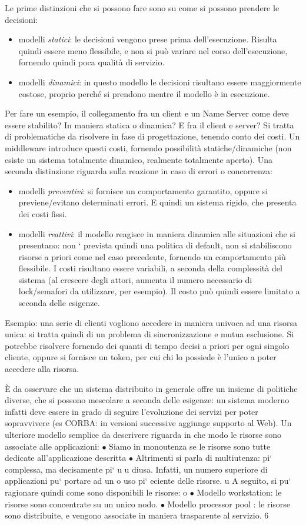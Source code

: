 \documentclass[a4paper,12pt]{article}
\begin{document}
Le prime distinzioni che si possono fare sono su come si possono prendere le decisioni:
\begin{itemize}
 \item modelli \textit{statici}: le decisioni vengono prese prima dell'esecuzione. Risulta quindi essere meno
flessibile, e non si può variare nel corso dell'esecuzione, fornendo quindi poca qualità di servizio.
\item modelli \textit{dinamici}: in questo modello le decisioni risultano essere maggiormente costose, proprio perché 
si prendono mentre il modello è in esecuzione.
\end{itemize}
Per fare un esempio, il collegamento fra un client e un Name Server come deve essere stabilito? In maniera statica o
dinamica? E fra il client e server? Si tratta di problematiche da risolvere in fase di progettazione, tenendo conto 
dei costi. Un middleware introduce questi costi, fornendo possibilità statiche/dinamiche (non esiste un sistema
totalmente dinamico, realmente totalmente aperto).
Una seconda distinzione riguarda sulla reazione in caso di errori o concorrenza:
\begin{itemize}
 \item modelli \textit{preventivi}: si fornisce un comportamento garantito, oppure si previene/evitano determinati
errori. E quindi un sistema rigido, che presenta dei costi fissi.
\item modelli \textit{reattivi}: il modello reagisce in maniera dinamica alle situazioni che si presentano: non `
prevista quindi una politica di default, non si stabiliscono risorse a priori come nel caso precedente, fornendo un
comportamento più flessibile. I costi risultano essere variabili, a seconda della complessità del sistema (al crescere
degli attori, aumenta il numero necessario di lock/semafori da utilizzare, per esempio). Il costo può quindi essere
limitato a seconda delle esigenze. 
\end{itemize}
Esempio: una serie di clienti vogliono accedere in maniera univoca ad una risorsa unica: si tratta quindi di un problema
di sincronizzazione e mutua esclusione.
Si potrebbe risolvere fornendo dei quanti di tempo decisi a priori per ogni singolo cliente, oppure si fornisce un
token, per cui chi lo possiede è l'unico a poter accedere alla risorsa.

È da osservare che un sistema distribuito in generale offre un insieme di politiche diverse, che si possono mescolare a
seconda delle esigenze: un sistema moderno infatti deve essere in grado di seguire l'evoluzione dei servizi per poter
sopravvivere (es CORBA: in versioni successive aggiunge supporto al Web).
Un ulteriore modello semplice da descrivere riguarda in che modo le risorse
sono associate alle applicazioni:
$\bullet$ Siamo in monoutenza se le risorse sono tutte dedicate all'applicazione
descritta
$\bullet$ Altrimenti si parla di multiutenza: pi` complessa, ma decisamente pi`
u
u
diusa. Infatti, un numero superiore di applicazioni pu` portare ad un
o
uso pi` eciente delle risorse.
u
A seguito, si pu` ragionare quindi come sono disponibili le risorse:
o
$\bullet$ Modello workstation: le risorse sono concentrate su un unico nodo.
$\bullet$ Modello processor pool : le risorse sono distribuite, e vengono associate in
maniera trasparente al servizio.
6
\newpage
\end{document}
